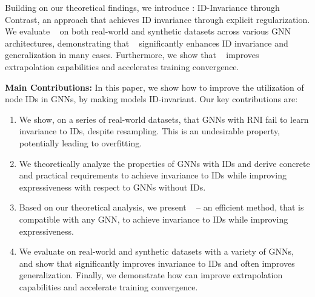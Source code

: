 Building on our theoretical findings, we introduce {\ourmethod}: ID-Invariance through Contrast, an approach that achieves ID invariance through explicit regularization. We evaluate \ourmethod~ on both real-world and synthetic datasets across various GNN architectures, demonstrating that \ourmethod~ significantly enhances ID invariance and generalization in many cases. Furthermore, we show that \ourmethod~ improves extrapolation capabilities and accelerates training convergence.


\textbf{Main Contributions:} In this paper, we show how to improve the utilization of node IDs in GNNs, by making models ID-invariant. Our key contributions are:
\begin{enumerate}
    \item  We show, on a series of real-world datasets, that GNNs with RNI fail to learn invariance to IDs, despite resampling. This is an undesirable property, potentially leading to overfitting.
    
 \item We theoretically analyze the properties of GNNs with IDs and derive concrete and practical requirements to achieve invariance to IDs while improving expressiveness with respect to GNNs without IDs. 
 \item Based on our theoretical analysis, we present \ourmethod~ --  an efficient method, that is compatible with any GNN, to achieve invariance to IDs while improving expressiveness.
 \item  We evaluate {\ourmethod} on real-world and synthetic datasets with a variety of GNNs, and show that {\ourmethod} significantly improves invariance to IDs and often improves generalization. Finally, we demonstrate how {\ourmethod} can improve extrapolation capabilities and accelerate training convergence.
\end{enumerate}
